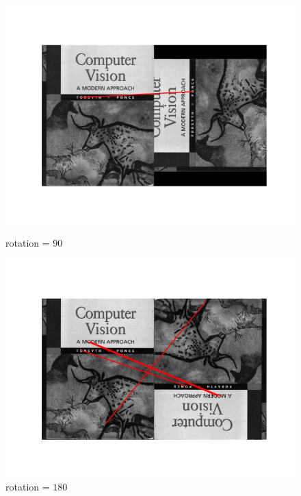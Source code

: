 \begin{problem}
  \begin{figure}[H]
    \centering
    \begin{minipage}{0.49\textwidth}
      \includegraphics[width=\textwidth]{images/matches-90.png}
      \caption{rotation = $90$}
      \label{fig:threshold-0.03}
    \end{minipage}
    \begin{minipage}{0.49\textwidth}
      \includegraphics[width=\textwidth]{images/matches-180.png}
      \caption{rotation = $180$}
      \label{fig:threshold-0.3}
    \end{minipage}
    \begin{minipage}{0.49\textwidth}

\end{minipage}
\end{figure}
\end{problem}
